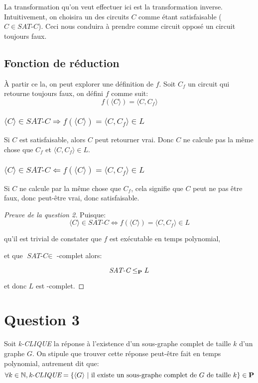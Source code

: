 \documentclass{article}
\newcommand\NP{{\normalfont{\textbf{NP}}}}
\newcommand\PP{{\normalfont{\textbf{P}}}}
\newcommand\SC{\textit{SAT-C}}
\newcommand\bk[1]{\langle #1 \rangle}
\newcommand\cli[1]{\textit{#1-CLIQUE}}
\begin{document}
La transformation qu'on veut effectuer ici est la transformation inverse. Intuitivement, on choisira un des circuits $C$ comme étant satisfaisable ($C \in \SC$). Ceci nous conduira à prendre comme circuit opposé un circuit toujours faux.

\subsection{Fonction de réduction}
À partir ce la, on peut explorer une définition de $f$. Soit $C_f$ un circuit qui retourne toujours faux, on défini $f$ comme suit:
$$f(\bk{C})=\bk{C, C_f}$$

\subsubsection{\normalfont $\bk{C} \in \SC \Rightarrow f(\bk{C})=\bk{C,C_f} \in L$}
Si $C$ est satisfaisable, alors $C$ peut retourner vrai. Donc $C$ ne calcule pas la même chose que $C_f$ et $\bk{C, C_f} \in L$.

\subsubsection{\normalfont $\bk{C} \in \SC \Leftarrow f(\bk{C})=\bk{C,C_f} \in L$}
Si $C$ ne calcule par la même chose que $C_f$, cela signifie que $C$ peut ne pas être faux, donc peut-être vrai, donc satisfaisable.

\begin{proof}[Preuve de la question 2]
  Puisque:
  $$\bk{C} \in \SC \Leftrightarrow f(\bk{C})=\bk{C,C_f} \in L$$

  qu'il est trivial de constater que $f$ est exécutable en temps polynomial,

  et que $\SC \in$ \NP-complet alors:
  
  $$\SC \leq_\PP L$$
  
  et donc $L$ est \NP-complet.
\end{proof}

\pagebreak

\section{Question 3}
Soit \cli{k} la réponse à l'existence d'un sous-graphe complet de taille $k$ d'un graphe $G$. On stipule que trouver cette réponse peut-être fait en temps polynomial, autrement dit que:
$$\forall k \in \mathbb{N}, \cli{k}=\{\bk{G}\text{ | il existe un sous-graphe complet de $G$ de taille $k$}\}\in \PP$$
\end{document}
